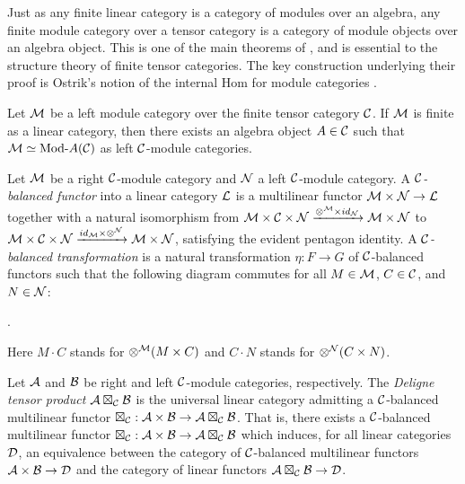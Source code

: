\documentclass{amsart}
\begin{document}
Just as any finite linear category is a category of modules over an algebra, any finite module category over a tensor category is a category of module objects over an algebra object.  
This is one of the main theorems of \cite{EGNO}, and is essential to the structure theory of finite tensor categories.  The key construction underlying their proof is Ostrik's notion of the internal Hom for module categories \cite{MR1976459}.

\begin{theorem} \label{thm:EGNO2.11.6} %
	Let $\mathcal M$ be a left module category over the finite tensor category $\mathcal C$. If $\mathcal M$ is finite as a linear category, then there exists an algebra object $A \in \mathcal C$ such that $\cM \simeq \Mod{}{A} (\cC)$ as left $\mathcal C$-module categories. 
\end{theorem}

\begin{definition}
	Let $\mathcal M$ be a right $\mathcal C$-module category and $\mathcal N$ a left $\mathcal C$-module category. A {\em $\mathcal C$-balanced functor} into a linear category $\mathcal L$ is a multilinear functor $\mathcal M \times \mathcal N \to \mathcal L$ together with a natural isomorphism from $\mathcal M \times \mathcal C \times \mathcal N \xrightarrow{\otimes^{\mathcal M} \times id_{\mathcal N}} \mathcal M \times \mathcal N$ to $\mathcal M \times \mathcal C \times \mathcal N \xrightarrow{id_{\mathcal M} \times \otimes^{\mathcal N}} \mathcal M \times \mathcal N$, satisfying the evident pentagon identity. A {\em $\mathcal C$-balanced transformation} is a natural transformation $\eta:F \to G$ of $\mathcal C$-balanced functors such that the following diagram commutes for all $M \in \mathcal M$, $C \in \mathcal C$, and $N \in \mathcal N$:
\begin{center}
.
\end{center}
\nid Here $M \cdot C$ stands for $\otimes^{\mathcal M}(M \times C)$ and $C \cdot N$ stands for $\otimes^{\mathcal N}(C \times N)$.
\end{definition}


\begin{definition}
	Let $\mathcal A$ and $\mathcal B$ be right and left $\mathcal C$-module categories, respectively. The {\em Deligne tensor product $\mathcal A \boxtimes_{\mathcal C} \mathcal B$} is the universal linear category admitting a $\mathcal C$-balanced multilinear functor $\boxtimes_{\mathcal C}: \mathcal A \times \mathcal B \to \mathcal A \boxtimes_{\mathcal C} \mathcal B$. That is, there exists a $\mathcal C$-balanced multilinear functor $\boxtimes_{\mathcal C}: \mathcal A \times \mathcal B \to \mathcal A \boxtimes_{\mathcal C} \mathcal B$ which induces, for all linear categories $\mathcal D$, an equivalence between the category of $\mathcal C$-balanced multilinear functors $\mathcal A \times \mathcal B \to \mathcal D$ and the category of linear functors $\mathcal A \boxtimes_{\mathcal C} \mathcal B \to \mathcal D$. 
\end{definition}
\end{document}

